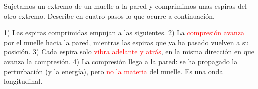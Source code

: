 \begin{exercise}
    Sujetamos un extremo de un muelle a la pared y comprimimos unas espiras del otro extremo. Describe en cuatro pasos lo que ocurre a continuación.
    \begin{solu}
        1) Las espiras comprimidas empujan a las siguientes. 2) La \textcolor{red}{compresión avanza} por el muelle hacia la pared, mientras las espiras que ya ha pasado vuelven a su posición. 3) Cada espira solo \textcolor{red}{vibra adelante y atrás}, en la misma dirección en que avanza la compresión. 4) La compresión llega a la pared: se ha propagado la perturbación (y la energía), pero \textcolor{red}{no la materia} del muelle. Es una onda longitudinal.
    \end{solu}
\end{exercise}

